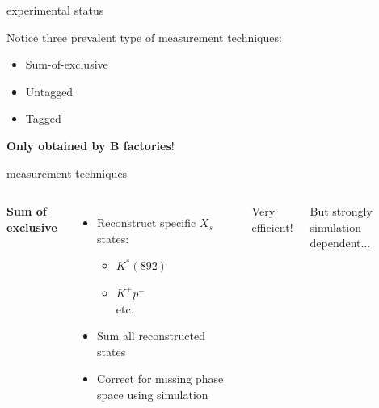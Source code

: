 \documentclass[xcolor=dvipsnames]{beamer}
\begin{document}
\begin{frame}{\safeBtoXsgamma experimental status}
         \vspace{10pt}

         Notice three prevalent type of measurement techniques:
         \begin{itemize}
            \item Sum-of-exclusive
            \item Untagged
            \item Tagged
         \end{itemize}
         \textbf{Only obtained by $\bm{B}$ factories}!
   \end{frame}

   \begin{frame}{\safeBtoXsgamma measurement techniques}
      \scriptsize
      \begin{columns}
         \centering
         
         \centering
         \textbf{Sum of exclusive}
         \begin{itemize}
            \item Reconstruct specific $X_s$ states:
            \begin{itemize}
               \item $K^*(892)$
               \item $K^+p^-$\\
               etc.
            \end{itemize} 
            \item Sum all reconstructed states
            \item Correct for missing phase space using simulation
         \end{itemize}

         Very efficient!

         But strongly simulation dependent...


      \end{columns}
   \end{frame}
\end{document}
